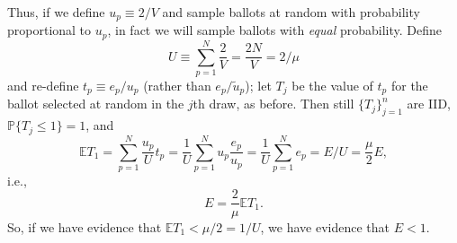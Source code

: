 Thus, if we define $u_p \equiv 2/V$ and
sample ballots at random with probability proportional to $u_p$, in fact
we will sample ballots with \emph{equal} probability.
Define
$$ 
   U \equiv \sum_{p=1}^N \frac{2}{V} = \frac{2N}{V} = 2/\mu
$$
and re-define $t_p \equiv e_p/u_p$ (rather than $e_p/\tilde{u}_p$);
let $T_j$ be the value of $t_p$ for the ballot selected at random in the
$j$th draw, as before.
Then still $\{T_j\}_{j=1}^n$ are IID, $\mathbb{P} \{T_j \le 1\} = 1$,
and
$$
  \mathbb{E} T_1 = \sum_{p=1}^N \frac{u_p}{U} t_p =
  \frac{1}{U}\sum_{p=1}^N u_p \frac{e_p}{u_p} = 
  \frac{1}{U} \sum_{p=1}^N e_p = E/U = \frac{\mu}{2} E,
$$
i.e., 
$$ 
    E = \frac{2}{\mu}\mathbb{E} T_1.
$$
So, if we have evidence that $\mathbb{E} T_1 < \mu/2 = 1/U$, we have evidence that 
$E < 1$.